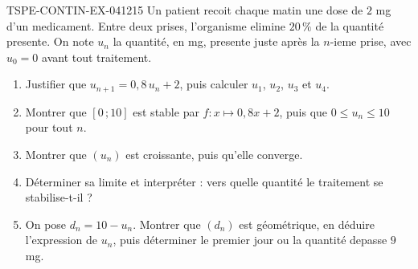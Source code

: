 \begin{exercice}{TSPE-CONTIN-EX-041}{2}{15}
Un patient recoit chaque matin une dose de $2$ mg d'un medicament. Entre deux prises, l'organisme elimine $20\,\%$ de la quantité presente. On note $u_n$ la quantité, en mg, presente juste après la $n$-ieme prise, avec $u_0 = 0$ avant tout traitement.
\begin{enumerate}
  \item Justifier que $u_{n+1} = 0{,}8\,u_n + 2$, puis calculer $u_1$, $u_2$, $u_3$ et $u_4$.
  \item Montrer que $[0\,;10]$ est stable par $f : x \mapsto 0{,}8x + 2$, puis que $0 \leq u_n \leq 10$ pour tout $n$.
  \item Montrer que $(u_n)$ est croissante, puis qu'elle converge.
  \item Déterminer sa limite et interpréter : vers quelle quantité le traitement se stabilise-t-il ?
  \item On pose $d_n = 10 - u_n$. Montrer que $(d_n)$ est géométrique, en déduire l'expression de $u_n$, puis déterminer le premier jour ou la quantité depasse $9$ mg.
\end{enumerate}
\end{exercice}

